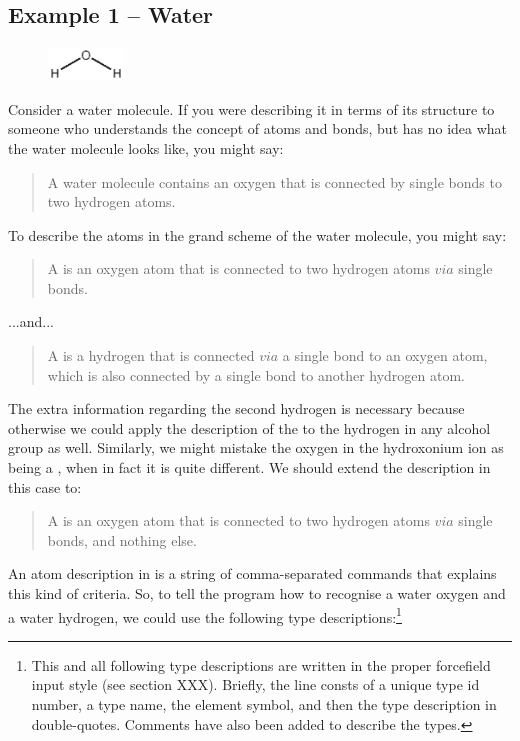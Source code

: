 \subsection{Example 1 -- Water}
\begin{figure} \includegraphics[width=2cm]{figures/water.eps} \end{figure}
Consider a water molecule. If you were describing it in terms of its structure to someone who understands the concept of atoms and bonds, but has no idea what the water molecule looks like, you might say:

\begin{quote}
	A water molecule contains an oxygen that is connected by single bonds to two hydrogen atoms.
\end{quote}

To describe the atoms in the grand scheme of the water molecule, you might say:

\begin{quote}
	A  is an oxygen atom that is connected to two hydrogen atoms $via$ single bonds.
\end{quote}

...and...

\begin{quote}
	A  is a hydrogen that is connected $via$ a single bond to an oxygen atom, which is also connected by a single bond to another hydrogen atom.
\end{quote}

The extra information regarding the second hydrogen is necessary because otherwise we could apply the description of the  to the hydrogen in any alcohol group as well. Similarly, we might mistake the oxygen in the hydroxonium ion as being a , when in fact it is quite different. We should extend the description in this case to:

\begin{quote}
	A  is an oxygen atom that is connected to two hydrogen atoms $via$ single bonds, and nothing else.
\end{quote}

An atom description in \progname{} is a string of comma-separated commands that explains this kind of criteria. So, to tell the program how to recognise a water oxygen and a water hydrogen, we could use the following type descriptions:\footnote{This and all following type descriptions are written in the proper forcefield input style (see section XXX). Briefly, the line consts of a unique type id number, a type name, the element symbol, and then the type description in double-quotes. Comments have also been added to describe the types.}


